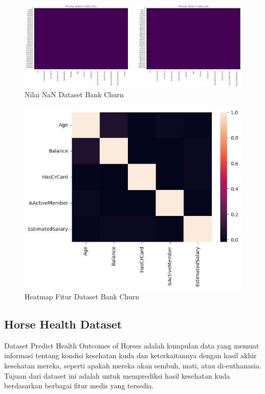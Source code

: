 \documentclass[conference]{IEEEtran}
\begin{document}
\begin{figure}[htbp]
    \centerline{\includegraphics[width=\linewidth]{churn_nan.png}}
    \caption{Nilai NaN Dataset Bank Churn}
    \label{churn_nan}
\end{figure}

\begin{figure}[htbp]
    \centerline{\includegraphics[width=\linewidth, scale=0.5]{churn_corr_heatmap.png}}
    \caption{Heatmap Fitur Dataset Bank Churn}
    \label{churn_corr}
\end{figure}

\subsection{Horse Health Dataset}
Dataset Predict Health Outcomes of Horses adalah kumpulan data yang memuat informasi tentang kondisi kesehatan kuda dan keterkaitannya 
dengan hasil akhir kesehatan mereka, seperti apakah mereka akan sembuh, mati, atau di-euthanasia. Tujuan dari dataset ini adalah untuk 
memprediksi hasil kesehatan kuda berdasarkan berbagai fitur medis yang tersedia.
\end{document}
